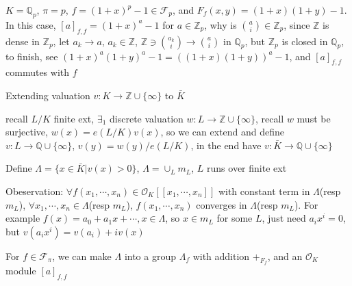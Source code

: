 \documentclass[main]{subfiles}
\begin{document}
\begin{example}
$K=\mathbb Q_p$, $\pi=p$, $f=(1+x)^p-1\in\mathscr F_p$, and $F_f(x,y)=(1+x)(1+y)-1$. In this case, $[a]_{f,f}=(1+x)^a-1$ for $a\in\mathbb Z_p$, why is $\binom{a}{i}\in\mathbb Z_p$, since $\mathbb Z$ is dense in $\mathbb Z_p$, let $a_k\to a$, $a_k\in\mathbb Z$, $\mathbb Z\ni\binom{a_k}{i}\to\binom{a}{i}$ in $\mathbb Q_p$, but $\mathbb Z_p$ is closed in $\mathbb Q_p$, to finish, see $(1+x)^a(1+y)^a-1=((1+x)(1+y))^a-1$, and $[a]_{f,f}$ commutes with $f$
\end{example}

Extending valuation $v:K\to \mathbb Z\cup\{\infty\}$ to $\bar K$

recall $L/K$ finite ext, $\exists_1$ discrete valuation $w:L\to\mathbb Z\cup\{\infty\}$, recall $w$ must be surjective, $w(x)=e(L/K)v(x)$, so we can extend and define $v:L\to\mathbb Q\cup\{\infty\}$, $v(y)=w(y)/e(L/K)$, in the end have $v:\bar K\to\mathbb Q\cup\{\infty\}$

Define $\Lambda=\{x\in\bar K|v(x)>0\}$, $\Lambda=\cup_Lm_L$, $L$ runs over finite ext

Obeservation: $\forall f(x_1,\cdots,x_n)\in\mathcal O_K[[x_1,\cdots,x_n]]$ with constant term in $\Lambda$(resp $m_L$), $\forall x_1,\cdots,x_n\in\Lambda$(resp $m_L$), $f(x_1,\cdots,x_n)$ converges in $\Lambda$(resp $m_L$). For example $f(x)=a_0+a_1x+\cdots,x\in\Lambda$, so $x\in m_L$ for some $L$, just need $a_ix^i=0$, but $v(a_ix^i)=v(a_i)+iv(x)$

For $f\in\mathscr F_\pi$, we can make $\Lambda$ into a group $\Lambda_f$ with addition $+_{F_f}$, and an $\mathcal O_K$ module $[a]_{f,f}$
\end{document}
